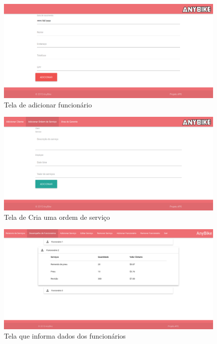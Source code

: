 \documentclass[
	12pt,				%
	openright,
	oneside,			%
	a4paper,			%
	chapter=TITLE,		%
	brazil				%
	]{abntex2}
\begin{document}
\begin{figure}[htb]
	\caption{Tela de adicionar funcionário}
	\begin{center}
	    \includegraphics[scale=0.3]{Arquivos/adicionar_funcionario}  
	\end{center}
\end{figure}


\begin{figure}[htb]
	\caption{Tela de Cria uma ordem de serviço}
	\begin{center}
	    \includegraphics[scale=0.3]{Arquivos/ordem_servico}  
	\end{center}
\end{figure}


\begin{figure}[htb]
	\caption{Tela que informa dados dos funcionários}
	\begin{center}
	    \includegraphics[scale=0.3]{Arquivos/relatorio_funcionario}  %
	\end{center}
\end{figure}
\end{document}
